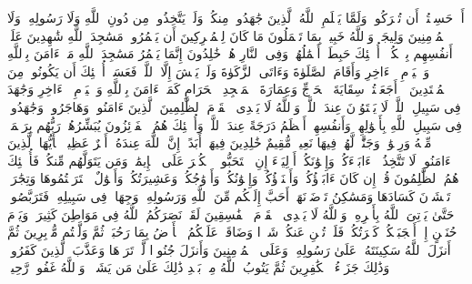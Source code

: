 \startbuffer[\q:9:16]
أَمۡ حَسِبۡتُمۡ أَن تُتۡرَكُوا۟ وَلَمَّا یَعۡلَمِ ٱللَّهُ ٱلَّذِینَ جَٰهَدُوا۟ مِنكُمۡ وَلَمۡ یَتَّخِذُوا۟ مِن دُونِ ٱللَّهِ وَلَا رَسُولِهِۦ وَلَا ٱلۡمُؤۡمِنِینَ وَلِیجَةࣰۚ وَٱللَّهُ خَبِیرُۢ بِمَا تَعۡمَلُونَ%
\stopbuffer
\startbuffer[\q:9:17]
مَا كَانَ لِلۡمُشۡرِكِینَ أَن یَعۡمُرُوا۟ مَسَٰجِدَ ٱللَّهِ شَٰهِدِینَ عَلَىٰۤ أَنفُسِهِم بِٱلۡكُفۡرِۚ أُو۟لَٰۤئِكَ حَبِطَتۡ أَعۡمَٰلُهُمۡ وَفِی ٱلنَّارِ هُمۡ خَٰلِدُونَ%
\stopbuffer
\startbuffer[\q:9:18]
إِنَّمَا یَعۡمُرُ مَسَٰجِدَ ٱللَّهِ مَنۡ ءَامَنَ بِٱللَّهِ وَٱلۡیَوۡمِ ٱلۡءَاخِرِ وَأَقَامَ ٱلصَّلَوٰةَ وَءَاتَى ٱلزَّكَوٰةَ وَلَمۡ یَخۡشَ إِلَّا ٱللَّهَۖ فَعَسَىٰۤ أُو۟لَٰۤئِكَ أَن یَكُونُوا۟ مِنَ ٱلۡمُهۡتَدِینَ%
\stopbuffer
\startbuffer[\q:9:19]
۞ أَجَعَلۡتُمۡ سِقَایَةَ ٱلۡحَاۤجِّ وَعِمَارَةَ ٱلۡمَسۡجِدِ ٱلۡحَرَامِ كَمَنۡ ءَامَنَ بِٱللَّهِ وَٱلۡیَوۡمِ ٱلۡءَاخِرِ وَجَٰهَدَ فِی سَبِیلِ ٱللَّهِۚ لَا یَسۡتَوُۥنَ عِندَ ٱللَّهِۗ وَٱللَّهُ لَا یَهۡدِی ٱلۡقَوۡمَ ٱلظَّٰلِمِینَ%
\stopbuffer
\startbuffer[\q:9:20]
ٱلَّذِینَ ءَامَنُوا۟ وَهَاجَرُوا۟ وَجَٰهَدُوا۟ فِی سَبِیلِ ٱللَّهِ بِأَمۡوَٰلِهِمۡ وَأَنفُسِهِمۡ أَعۡظَمُ دَرَجَةً عِندَ ٱللَّهِۚ وَأُو۟لَٰۤئِكَ هُمُ ٱلۡفَاۤئِزُونَ%
\stopbuffer
\startbuffer[\q:9:21]
یُبَشِّرُهُمۡ رَبُّهُم بِرَحۡمَةࣲ مِّنۡهُ وَرِضۡوَٰنࣲ وَجَنَّٰتࣲ لَّهُمۡ فِیهَا نَعِیمࣱ مُّقِیمٌ%
\stopbuffer
\startbuffer[\q:9:22]
خَٰلِدِینَ فِیهَاۤ أَبَدًاۚ إِنَّ ٱللَّهَ عِندَهُۥۤ أَجۡرٌ عَظِیمࣱ%
\stopbuffer
\startbuffer[\q:9:23]
یَٰۤأَیُّهَا ٱلَّذِینَ ءَامَنُوا۟ لَا تَتَّخِذُوۤا۟ ءَابَاۤءَكُمۡ وَإِخۡوَٰنَكُمۡ أَوۡلِیَاۤءَ إِنِ ٱسۡتَحَبُّوا۟ ٱلۡكُفۡرَ عَلَى ٱلۡإِیمَٰنِۚ وَمَن یَتَوَلَّهُم مِّنكُمۡ فَأُو۟لَٰۤئِكَ هُمُ ٱلظَّٰلِمُونَ%
\stopbuffer
\startbuffer[\q:9:24]
قُلۡ إِن كَانَ ءَابَاۤؤُكُمۡ وَأَبۡنَاۤؤُكُمۡ وَإِخۡوَٰنُكُمۡ وَأَزۡوَٰجُكُمۡ وَعَشِیرَتُكُمۡ وَأَمۡوَٰلٌ ٱقۡتَرَفۡتُمُوهَا وَتِجَٰرَةࣱ تَخۡشَوۡنَ كَسَادَهَا وَمَسَٰكِنُ تَرۡضَوۡنَهَاۤ أَحَبَّ إِلَیۡكُم مِّنَ ٱللَّهِ وَرَسُولِهِۦ وَجِهَادࣲ فِی سَبِیلِهِۦ فَتَرَبَّصُوا۟ حَتَّىٰ یَأۡتِیَ ٱللَّهُ بِأَمۡرِهِۦۗ وَٱللَّهُ لَا یَهۡدِی ٱلۡقَوۡمَ ٱلۡفَٰسِقِینَ%
\stopbuffer
\startbuffer[\q:9:25]
لَقَدۡ نَصَرَكُمُ ٱللَّهُ فِی مَوَاطِنَ كَثِیرَةࣲ وَیَوۡمَ حُنَیۡنٍ إِذۡ أَعۡجَبَتۡكُمۡ كَثۡرَتُكُمۡ فَلَمۡ تُغۡنِ عَنكُمۡ شَیۡءࣰا وَضَاقَتۡ عَلَیۡكُمُ ٱلۡأَرۡضُ بِمَا رَحُبَتۡ ثُمَّ وَلَّیۡتُم مُّدۡبِرِینَ%
\stopbuffer
\startbuffer[\q:9:26]
ثُمَّ أَنزَلَ ٱللَّهُ سَكِینَتَهُۥ عَلَىٰ رَسُولِهِۦ وَعَلَى ٱلۡمُؤۡمِنِینَ وَأَنزَلَ جُنُودࣰا لَّمۡ تَرَوۡهَا وَعَذَّبَ ٱلَّذِینَ كَفَرُوا۟ۚ وَذَٰلِكَ جَزَاۤءُ ٱلۡكَٰفِرِینَ%
\stopbuffer
\startbuffer[\q:9:27]
ثُمَّ یَتُوبُ ٱللَّهُ مِنۢ بَعۡدِ ذَٰلِكَ عَلَىٰ مَن یَشَاۤءُۗ وَٱللَّهُ غَفُورࣱ رَّحِیمࣱ%
\stopbuffer

